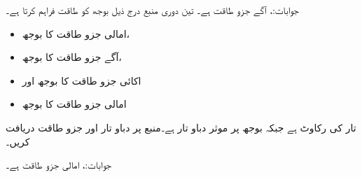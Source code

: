 جوابات:، آگے جزو طاقت  ہے۔
تین دوری  منبع درج ذیل بوجھ کو طاقت فراہم کرتا ہے۔
\begin{itemize}
\item
{} امالی جزو طاقت کا  بوجھ،
\item
{} آگے جزو طاقت کا  بوجھ،
\item
اکائی جزو طاقت کا  بوجھ اور
\item
{} امالی جزو طاقت کا  بوجھ
\end{itemize}
تار کی رکاوٹ  ہے جبکہ بوجھ پر موثر دباو تار  ہے۔منبع پر دباو تار اور جزو طاقت دریافت کریں۔

جوابات:، امالی جزو طاقت  ہے۔
